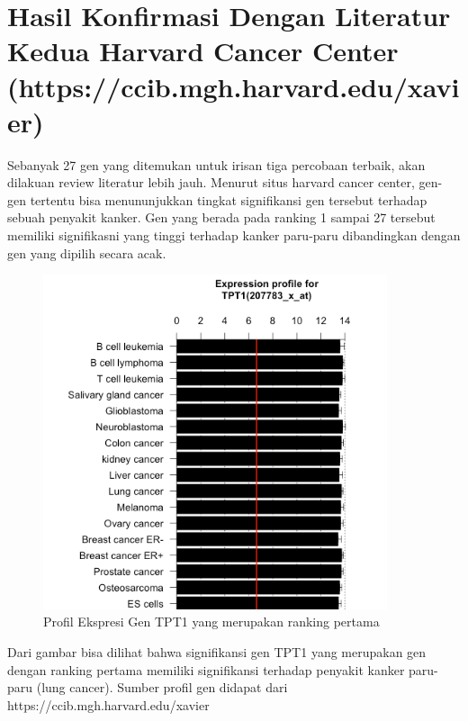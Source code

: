 \section{Hasil Konfirmasi Dengan Literatur Kedua Harvard Cancer Center (https://ccib.mgh.harvard.edu/xavier)}
Sebanyak 27 gen yang ditemukan untuk irisan tiga percobaan terbaik, akan dilakuan review literatur lebih jauh. Menurut situs harvard cancer center, gen-gen tertentu bisa menununjukkan tingkat signifikansi gen tersebut terhadap sebuah penyakit kanker. Gen yang berada pada ranking 1 sampai 27 tersebut memiliki signifikasni yang tinggi terhadap kanker paru-paru dibandingkan dengan gen yang dipilih secara acak.
\begin{figure}
	\centering
	\includegraphics[width=0.9\textwidth]
		{pics/tpt1.png}
	\caption{Profil Ekspresi Gen TPT1 yang merupakan ranking pertama}
	\label{fig:tpt1}
\end{figure}
Dari gambar bisa dilihat bahwa signifikansi gen TPT1 yang merupakan gen dengan ranking pertama memiliki signifikansi terhadap penyakit kanker paru-paru (lung cancer). Sumber profil gen didapat dari https://ccib.mgh.harvard.edu/xavier

